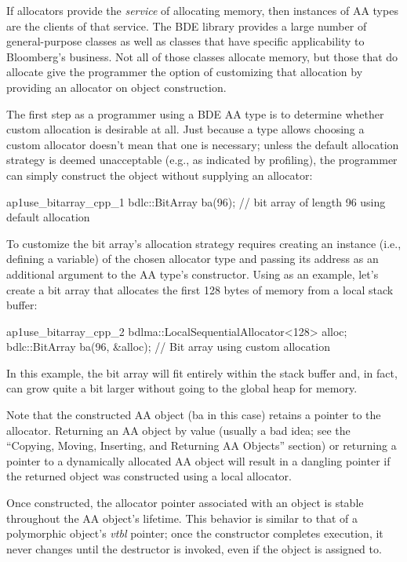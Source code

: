 If allocators provide the \emph{service} of allocating memory, then instances of AA
types are the clients of that service. The BDE library provides a large number of
general-purpose classes as well as classes that have specific applicability to
Bloomberg’s business. Not all of those classes allocate memory, but those that
do allocate give the programmer the option of customizing that allocation by
providing an allocator on object construction.

The first step as a programmer using a BDE AA type is to determine whether
custom allocation is desirable at all. Just because a type allows choosing a
custom allocator doesn’t mean that one is necessary; unless the default
allocation strategy is deemed unacceptable (e.g., as indicated by profiling), the
programmer can simply construct the object without supplying an allocator:
\begin{cppcodeblock}{ap1use_bitarray_cpp_1}
    bdlc::BitArray ba(96); // bit array of length 96 using default allocation
\end{cppcodeblock}
To customize the bit array’s allocation strategy requires creating an instance
(i.e., defining a variable) of the chosen allocator type and passing its address as
an additional argument to the AA type’s constructor. Using
 as an example, let’s create a bit array that allocates
the first 128 bytes of memory from a local stack buffer:
\begin{cppcodeblock}{ap1use_bitarray_cpp_2}
    bdlma::LocalSequentialAllocator<128> alloc;
    bdlc::BitArray ba(96, &alloc); // Bit array using custom allocation
\end{cppcodeblock}
In this example, the bit array will fit entirely within the stack buffer and, in
fact, can grow quite a bit larger without going to the global heap for memory.

Note that the constructed AA object (ba in this case) retains a pointer to the
allocator. Returning an AA object by value (usually a bad idea; see the
“Copying, Moving, Inserting, and Returning AA Objects” section) or returning a
pointer to a dynamically allocated AA object will result in a dangling pointer if
the returned object was constructed using a local allocator.

Once constructed, the allocator pointer associated with an object is stable
throughout the AA object’s lifetime. This behavior is similar to that of a
polymorphic object’s \emph{vtbl} pointer; once the constructor completes execution, it
never changes until the destructor is invoked, even if the object is assigned to.


